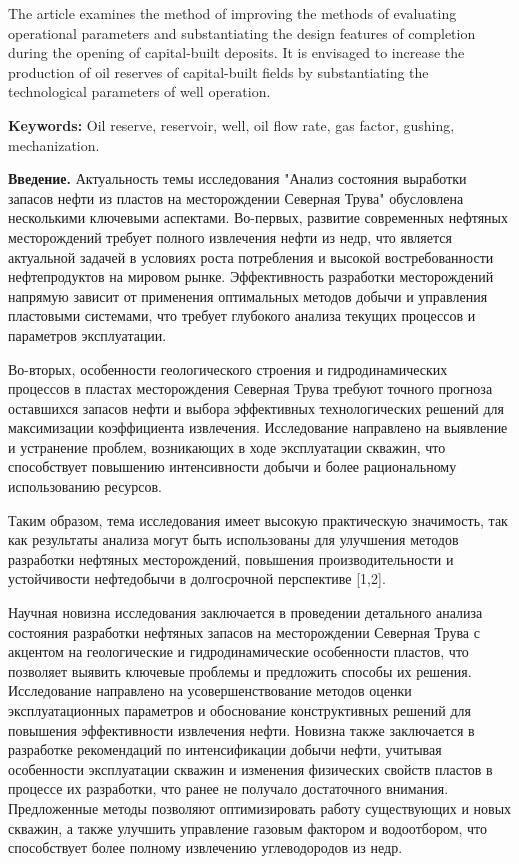 The article examines the method of improving the methods of evaluating
operational parameters and substantiating the design features of
completion during the opening of capital-built deposits. It is envisaged
to increase the production of oil reserves of capital-built fields by
substantiating the technological parameters of well operation.

{\bfseries Keywords:} Oil reserve, reservoir, well, oil flow rate, gas factor,
gushing, mechanization.

\begin{multicols}{2}
{\bfseries Введение.} Актуальность темы исследования "Анализ состояния выработки
запасов нефти из пластов на месторождении Северная Трува" обусловлена
несколькими ключевыми аспектами. Во-первых, развитие современных
нефтяных месторождений требует полного извлечения нефти из недр, что
является актуальной задачей в условиях роста потребления и высокой
востребованности нефтепродуктов на мировом рынке. Эффективность
разработки месторождений напрямую зависит от применения оптимальных
методов добычи и управления пластовыми системами, что требует глубокого
анализа текущих процессов и параметров эксплуатации.

Во-вторых, особенности геологического строения и гидродинамических
процессов в пластах месторождения Северная Трува требуют точного
прогноза оставшихся запасов нефти и выбора эффективных технологических
решений для максимизации коэффициента извлечения. Исследование
направлено на выявление и устранение проблем, возникающих в ходе
эксплуатации скважин, что способствует повышению интенсивности добычи и
более рациональному использованию ресурсов.

Таким образом, тема исследования имеет высокую практическую значимость,
так как результаты анализа могут быть использованы для улучшения методов
разработки нефтяных месторождений, повышения производительности и
устойчивости нефтедобычи в долгосрочной перспективе {[}1,2{]}.

Научная новизна исследования заключается в проведении детального анализа
состояния разработки нефтяных запасов на месторождении Северная Трува с
акцентом на геологические и гидродинамические особенности пластов, что
позволяет выявить ключевые проблемы и предложить способы их решения.
Исследование направлено на усовершенствование методов оценки
эксплуатационных параметров и обоснование конструктивных решений для
повышения эффективности извлечения нефти. Новизна также заключается в
разработке рекомендаций по интенсификации добычи нефти, учитывая
особенности эксплуатации скважин и изменения физических свойств пластов
в процессе их разработки, что ранее не получало достаточного внимания.
Предложенные методы позволяют оптимизировать работу существующих и новых
скважин, а также улучшить управление газовым фактором и водоотбором, что
способствует более полному извлечению углеводородов из недр.


\end{multicols}
